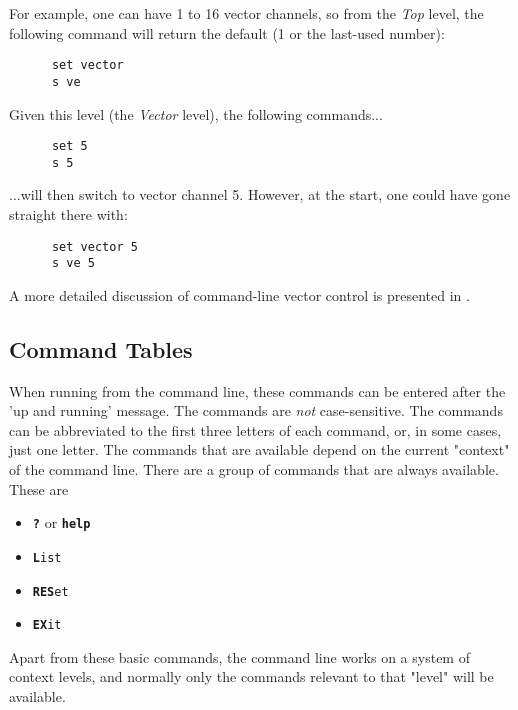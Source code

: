    For example, one can have 1 to 16 vector channels, so from the
   \textsl{Top} level, the following command
   will return the default  (1 or the last-used number):

   \begin{verbatim}
      set vector
      s ve
   \end{verbatim}

   Given this level (the \textsl{Vector} level), the following commands...

   \begin{verbatim}
      set 5 
      s 5
   \end{verbatim}

   ...will then switch to vector channel 5.
   However, at the start, one could have gone straight there with:

   \begin{verbatim}
      set vector 5
      s ve 5
   \end{verbatim}

   A more detailed discussion of command-line vector control is presented in
   .

\subsection{Command Tables}
\label{subsec:command_line_command_table}

   When running from the command line, these commands
   can be entered after the 'up and running' message.
   The commands are \textsl{not} case-sensitive.
   The commands can be abbreviated to the first three letters of each command,
   or, in some cases, just one letter.
   The commands that are available depend on the current "context" of the
   command line.
   There are a group of commands that are always available. These are

   \begin{itemize}
      \item \texttt{\textbf{?}} or \texttt{\textbf{help}}
      \item \texttt{\textbf{L}ist}
      \item \texttt{\textbf{RES}et}
      \item \texttt{\textbf{EX}it}
   \end{itemize}

   Apart from these basic commands, the command line works on a system of
   context levels, and normally only the commands relevant to that "level"
   will be available.

